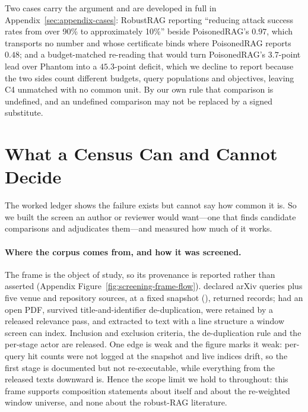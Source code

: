 \documentclass[11pt]{article}
\begin{document}
Two cases carry the argument and are developed in full in
Appendix~\ref{sec:appendix-cases}: RobustRAG reporting ``reducing attack
success rates from over 90\% to approximately 10\%'' beside PoisonedRAG's
$0.97$, which
transports no number and whose certificate binds where PoisonedRAG reports
$0.48$; and a budget-matched re-reading that would turn PoisonedRAG's
$3.7$-point lead over Phantom into a $45.3$-point deficit, which we decline to
report because the two sides count different budgets, query populations and
objectives, leaving C4 unmatched with no common unit. By our own rule that
comparison is undefined, and an undefined comparison may not be replaced by a
signed substitute.

\section{What a Census Can and Cannot Decide}
\label{sec:census}
\label{sec:applied}
\label{sec:protocol}

The worked ledger shows the failure exists but cannot say how common it is. So
we built the screen an author or reviewer would want---one that finds candidate
comparisons and adjudicates them---and measured how much of it works.

\paragraph{Where the corpus comes from, and how it was screened.}
The frame is the object of study, so its provenance is reported rather than
asserted (Appendix Figure~\ref{fig:screening-frame-flow}). \FlowQueries{}
declared arXiv queries plus five venue and repository sources, at a fixed
snapshot (\FlowSnapshot{}), returned \FlowRetrieved{} records; \FlowOpenPDF{}
had an open PDF, \FlowDedup{} survived title-and-identifier de-duplication,
\FlowScreened{} were retained by a released relevance pass, and \FlowTexts{}
extracted to text with a line structure a window screen can index. Inclusion and
exclusion criteria, the de-duplication rule and the per-stage actor are
released. One edge is weak and the figure marks it weak: per-query hit counts
were not logged at the snapshot and live indices drift, so the first stage is
documented but not re-executable, while everything from the \FlowTexts{}
released texts downward is. Hence the scope limit we hold to throughout: this
frame supports composition statements about itself and about the re-weighted
window universe, and none about the robust-RAG literature.
\end{document}
